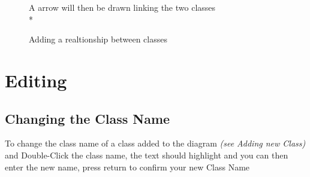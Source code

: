 \documentclass[a4paper]{article}
\begin{document}
\begin{figure}[H]
\begin{center}
\end{center}
A arrow will then be drawn linking the two classes\\*
\begin{center}
\caption{Adding a realtionship between classes}
\end{center}
\end{figure}


\section{Editing}
\subsection{Changing the Class Name}
To change the class name of a class added to the diagram \emph{(see Adding new Class)} and Double-Click the class name, the text should highlight and you can then enter the new name, press return to confirm your new Class Name
\end{document}
